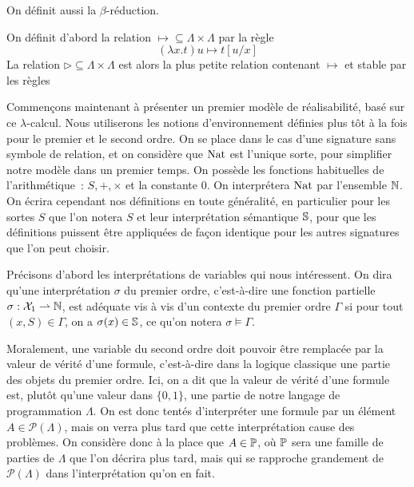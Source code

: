 \documentclass{article}
\begin{document}
On définit aussi la $\beta$-réduction.

\begin{defi}
    On définit d'abord la relation $\mapsto\subseteq \Lambda\times\Lambda$ par la règle
    \[(\lambda x.t)u \mapsto t[u/x]\]
    La relation $\rhd\subseteq \Lambda\times\Lambda$ est alors la plus petite relation contenant $\mapsto$ et stable par les règles
    \begin{center}
        \begin{prooftree}
        \end{prooftree}
        \qquad
        \begin{prooftree}
        \end{prooftree}
        \qquad
        \begin{prooftree}
        \end{prooftree}
    \end{center}
\end{defi}

Commençons maintenant à présenter un premier modèle de réalisabilité, basé sur ce $\lambda$-calcul. Nous utiliserons les notions d'environnement définies plus tôt à la fois pour le premier et le second ordre. On se place dans le cas d'une signature sans symbole de relation, et on considère que $\Nat$ est l'unique sorte, pour simplifier notre modèle dans un premier temps. On possède les fonctions habituelles de l'arithmétique~: $S,+,\times$ et la constante $0$. On interprétera $\Nat$ par l'ensemble $\bN$. On écrira cependant nos définitions en toute généralité, en particulier pour les sortes $S$ que l'on notera $S$ et leur interprétation sémantique $\bS$, pour que les définitions puissent être appliquées de façon identique pour les autres signatures que l'on peut choisir.

Précisons d'abord les interprétations de variables qui nous intéressent. On dira qu'une interprétation $\sigma$ du premier ordre, c'est-à-dire une fonction partielle $\sigma : \mathcal X_1 \rightharpoonup \bN$, est adéquate vis à vis d'un contexte du premier ordre $\Gamma$ si pour tout $(x,S) \in \Gamma$, on a $\sigma(x) \in \bS$, ce qu'on notera $\sigma \models \Gamma$.

Moralement, une variable du second ordre doit pouvoir être remplacée par la valeur de vérité d'une formule, c'est-à-dire dans la logique classique une partie des objets du premier ordre. Ici, on a dit que la valeur de vérité d'une formule est, plutôt qu'une valeur dans $\{0,1\}$, une partie de notre langage de programmation $\Lambda$. On est donc tentés d'interpréter une formule par un élément $A \in \mathcal P(\Lambda)$, mais on verra plus tard que cette interprétation cause des problèmes. On considère donc à la place que $A \in \bP$, où $\bP$ sera une famille de parties de $\Lambda$ que l'on décrira plus tard, mais qui se rapproche grandement de $\mathcal P(\Lambda)$ dans l'interprétation qu'on en fait.
\end{document}
